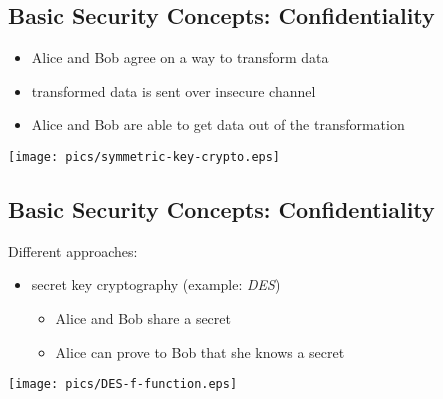 \documentclass[xga]{xdvislides}
\begin{document}
%
\subsection{Basic Security Concepts: Confidentiality}
\begin{itemize}
	\item Alice and Bob agree on a way to transform data
	\item transformed data is sent over insecure channel
	\item Alice and Bob are able to get data out of the transformation
\end{itemize}
\addvspace{.5in}
\begin{center}
	\texttt{[image: pics/symmetric-key-crypto.eps]}
\end{center}

\subsection{Basic Security Concepts: Confidentiality}
Different approaches:
\begin{itemize}
	\item secret key cryptography (example: {\em DES})
		\begin{itemize}
			\item Alice and Bob share a secret
			\item Alice can prove to Bob that she knows a secret
		\end{itemize}
\end{itemize}
 \begin{center}
        \texttt{[image: pics/DES-f-function.eps]} \\
 \end{center}
\end{document}
